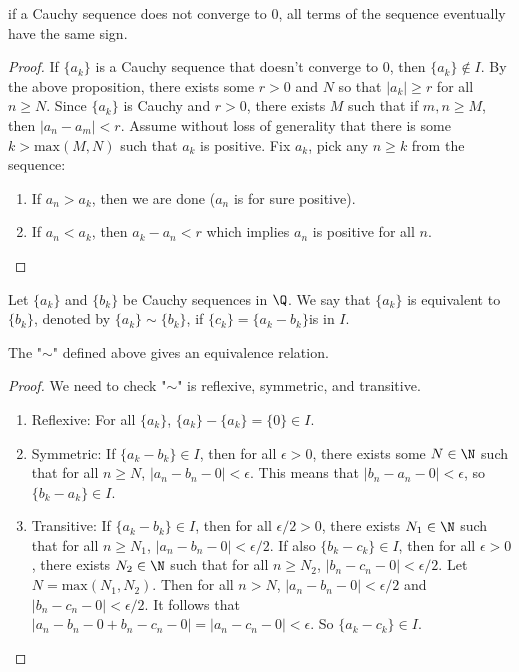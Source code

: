 \documentclass[10pt]{article}
\begin{document}
\begin{corollary}
    if a Cauchy sequence does not converge to 0, all terms of the sequence eventually have the same sign.
\end{corollary}
\begin{proof}
    If $\{a_k\}$ is a Cauchy sequence that doesn't converge to 0, then $\{a_k\}\notin I$. By the above proposition, there exists some $ r>0$ and $N$ so that $| a_k|\geq r$ for all $n\geq N$. Since $\{a_k\}$ is Cauchy and $r>0$, there exists $M$ such that if $m,n \geq M$, then $| a_n-a_m|< r$. Assume without loss of generality that there is some $k>\text{max} (M,N)$ such that $a_k$ is positive. Fix $a_k$, pick any $n\geq k$ from the sequence:
    \begin{enumerate}
        \item[\circled{1}] If $a_n>a_k$, then we are done ($a_n$ is for sure positive).
        \item[\circled{2}] If $a_n<a_k$, then $a_k-a_n<r$ which implies $a_n$ is positive for all $n$.
    \end{enumerate}
\end{proof}
\begin{definition}
    Let $\{a_k\}$ and $\{b_k\}$ be Cauchy sequences in $\Q$. We say that $\{a_k\}$ is equivalent to $\{b_k\}$, denoted by $\{a_k\}\sim\{b_k\}$, if $\{c_k\} = \{a_k-b_k\}$is in $I$.
\end{definition}
\begin{proposition}
    The "$\sim$" defined above gives an equivalence relation.
\end{proposition}
\begin{proof}
    We need to check "$\sim$" is reflexive, symmetric, and transitive.
    \begin{enumerate}
        \item[] Reflexive: For all $\{a_k\}$, $\{a_k\} - \{a_k\} = \{0\} \in I$.
        \item[] Symmetric: If $\{a_k - b_k\} \in I$, then for all $\epsilon > 0$, there exists some $N \in \N$ such that for all $ n \geq N$, $|a_n - b_n - 0| < \epsilon$. This means that $|b_n - a_n - 0| < \epsilon$, so $\{b_k - a_k\} \in I$.
        \item[] Transitive: If $\{a_k - b_k\} \in I$, then for all $\epsilon / 2 > 0$, there exists $N_1 \in \N$ such that for all $ n \geq N_1$, $|a_n - b_n - 0| <  \epsilon/ 2$. If also $\{b_k - c_k\} \in I$, then for all $ \epsilon > 0$, there exists $ N_2 \in \N$ such that for all $n \geq N_2$, $|b_n - c_n - 0| < \epsilon/ 2$. Let $N = \text{max}(N_1, N_2)$. Then for all $n > N$, $|a_n - b_n - 0| <  \epsilon/ 2$ and $|b_n - c_n - 0| <  \epsilon/ 2$. It follows that $|a_n - b_n - 0 + b_n - c_n - 0| = |a_n - c_n - 0| < \epsilon$. So $\{a_k - c_k\} \in I$.
    \end{enumerate}
\end{proof}
\end{document}
